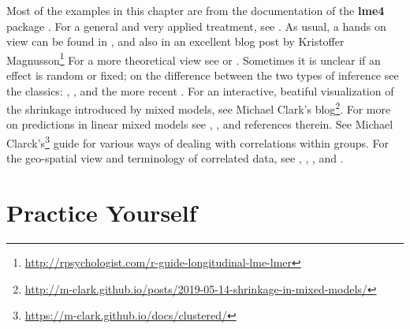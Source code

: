 \documentclass[]{book}
\renewcommand{\href}[2]{#2\footnote{\url{#1}}}
\theoremstyle{definition}
\theoremstyle{definition}
\theoremstyle{definition}
\theoremstyle{remark}
\begin{document}
Most of the examples in this chapter are from the documentation of the \textbf{lme4} package \citep{lme4}.
For a general and very applied treatment, see \citet{pinero2000mixed}.
As usual, a hands on view can be found in \citet{venables2013modern}, and also in an excellent blog post by \href{http://rpsychologist.com/r-guide-longitudinal-lme-lmer}{Kristoffer Magnusson}
For a more theoretical view see \citet{weiss2005modeling} or \citet{searle2009variance}.
Sometimes it is unclear if an effect is random or fixed; on the difference between the two types of inference see the classics: \citet{eisenhart1947assumptions}, \citet{kempthorne1975fixed}, and the more recent \citet{rosset2018fixed}.
For an interactive, beatiful visualization of the shrinkage introduced by mixed models, see \href{http://m-clark.github.io/posts/2019-05-14-shrinkage-in-mixed-models/}{Michael Clark's blog}.
For more on predictions in linear mixed models see \citet{robinson1991blup}, \citet{rabinowicz2018assessing}, and references therein.
See \href{https://m-clark.github.io/docs/clustered/}{Michael Clarck's} guide for various ways of dealing with correlations within groups.
For the geo-spatial view and terminology of correlated data, see \citet{christakos2000modern}, \citet{diggle1998model}, \citet{allard2013j}, and \citet{cressie2015statistics}.

\hypertarget{practice-yourself-4}{%
\section{Practice Yourself}\label{practice-yourself-4}}
\end{document}
